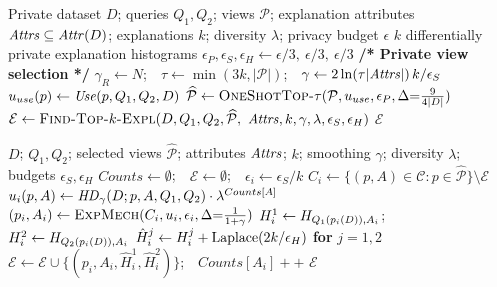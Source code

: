 \begin{algorithm}[t]
\caption{Private-Queries-Diff-Top-$k$-Explanation}
\label{alg:main}
\begin{algorithmic}[1]
\Require Private dataset $D$; queries $Q_1,Q_2$; views $\mathcal{P}$; explanation attributes $\mathit{Attrs}\subseteq\mathit{Attr}(D)$; explanations $k$; diversity $\lambda$; privacy budget $\epsilon$
\Ensure $k$ differentially private explanation histograms
\State $\epsilon_P,\epsilon_S,\epsilon_H \gets \epsilon/3,\ \epsilon/3,\ \epsilon/3$ 
\State \textbf{/* Private view selection */}
\State $\gamma_R\gets N$;\ \ $\tau\gets\min(3k,|\mathcal{P}|)$;\ \ $\gamma\gets 2\ln(\tau|\mathit{Attrs}|)\,k/\epsilon_S$
\State $u_{use}(p)\gets \mathit{Use}(p,Q_1,Q_2,D)$
\State $\widehat{\mathcal{P}}\gets \textsc{OneShotTop-}\tau(\mathcal{P},u_{use},\epsilon_P,\Delta{=}\tfrac{9}{4|D|})$
\State $\mathcal{E}\gets \textsc{Find-Top-$k$-Expl}(D,Q_1,Q_2,\widehat{\mathcal{P}},$
\Statex \hspace{\algorithmicindent}$\mathit{Attrs},k,\gamma,\lambda,\epsilon_S,\epsilon_H)$
\State \Return $\mathcal{E}$
\end{algorithmic}
\end{algorithm}


\begin{algorithm}[t]
\caption{Find-Top-$k$-Explanations}
\label{alg:topk}
\begin{algorithmic}[1]
\Require $D$; $Q_1,Q_2$; selected views $\widehat{\mathcal{P}}$; attributes $\mathit{Attrs}$; $k$; smoothing $\gamma$; diversity $\lambda$; budgets $\epsilon_S,\epsilon_H$
\State $Counts\gets\emptyset$;\ \ $\mathcal{E}\gets\emptyset$;\ \ $\epsilon_i \gets \epsilon_S/k$
  \State $C_i \gets \{(p,A)\in\mathcal{C}: p\in\widehat{\mathcal{P}}\}\setminus \mathcal{E}$
  \State $u_i(p,A)\gets \mathit{HD}_{\gamma}(D;p,A,Q_1,Q_2)\cdot \lambda^{Counts[A]}$
  \State $(p_i,A_i)\gets \textsc{ExpMech}(C_i,u_i,\epsilon_i,\Delta{=}\tfrac{1}{1+\gamma})$
  \State $H^1_i\gets H_{Q_1(p_i(D)),A_i}$;\ \ $H^2_i\gets H_{Q_2(p_i(D)),A_i}$
  \State $\hat H^j_i\gets H^j_i+\operatorname{Laplace}(2k/\epsilon_H)$ \textbf{for} $j=1,2$
  \State $\mathcal{E}\gets\mathcal{E}\cup\{(p_i,A_i,\hat H^1_i,\hat H^2_i)\}$;\ \ $Counts[A_i]{+}{+}$
\EndFor
\State \Return $\mathcal{E}$
\end{algorithmic}
\end{algorithm}

